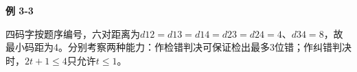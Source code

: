 {\color{ink}\bfseries 例 3-3}\par\vspace{1bp}四码字按题序编号，六对距离为\(d12=\allowbreak{}d13=\allowbreak{}d14=\allowbreak{}d23=\allowbreak{}d24=\allowbreak{}4\)、\(d34=\allowbreak{}8\)，故最小码距为4。分别考察两种能力：作检错判决可保证检出最多3位错；作纠错判决时，\(2t+\allowbreak{}1\le 4\)只允许\(t\le 1\)。
